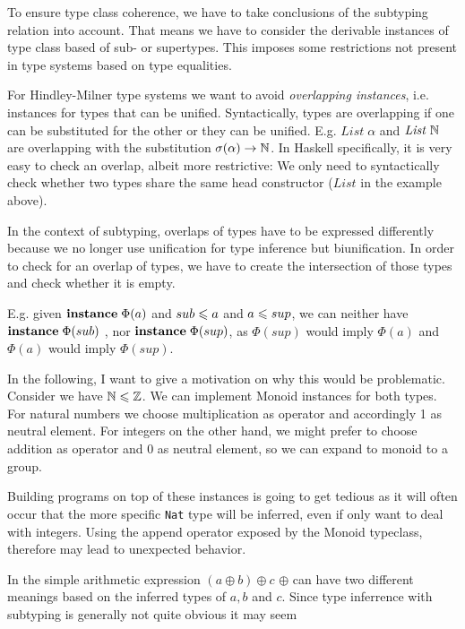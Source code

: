 To ensure type class coherence, we have to take conclusions of the subtyping relation into account.
That means we have to consider the derivable instances of type class based of sub- or supertypes.
This imposes some restrictions not present in type systems based on type equalities.

  For Hindley-Milner type systems we want to avoid \emph{overlapping instances}, i.e. instances for types that can be unified. \cite{peytonjones1997type}
  Syntactically, types are overlapping if one can be substituted for the other or they can be unified.
  E.g. $\mathit{List} \; \alpha$ and $\mathit{List} \; \mathbb{N}$ are overlapping with the substitution $\sigma(\alpha) \to \mathbb{N}$.
  In Haskell specifically, it is very easy to check an overlap, albeit more restrictive: We only need to syntactically check whether two types share the same head constructor ($\mathit{List}$ in the example above).

In the context of subtyping, overlaps of types have to be expressed differently because we no longer use unification for type inference but biunification.
In order to check for an overlap of types, we have to create the intersection of those types and check whether it is empty.

E.g. given ${\bf instance} \; \Phi(a)$ and $sub \leqslant a$ and $a \leqslant sup$, we can neither have ${\bf instance} \; \Phi(sub)$ , nor ${\bf instance} \; \Phi(sup)$,
as $\Phi(sup)$ would imply $\Phi(a)$ and $\Phi(a)$ would imply $\Phi(sup)$.

In the following, I want to give a motivation on why this would be problematic.
Consider we have $\mathbb{N} \leqslant \mathbb{Z}$.
We can implement Monoid instances for both types. For natural numbers we choose multiplication as operator and accordingly 1 as neutral element.
For integers on the other hand, we might prefer to choose addition as operator and 0 as neutral element, so we can expand to monoid to a group.

Building programs on top of these instances is going to get tedious as it will often occur that the more specific \texttt{Nat} type will be inferred,
even if only want to deal with integers.
Using the append operator exposed by the Monoid typeclass, therefore may lead to unexpected behavior.

In the simple arithmetic expression $(a \oplus b) \oplus c$ $\oplus$ can have two different meanings based on the inferred types of $a,b$ and $c$.
Since type inferrence with subtyping is generally not quite obvious it may seem

